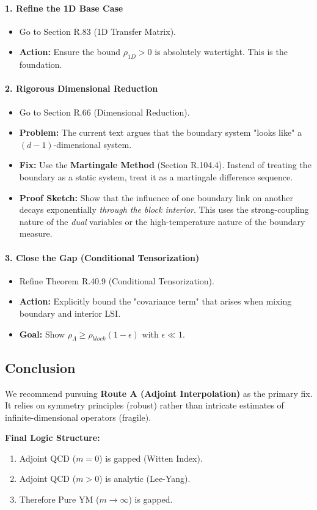 \paragraph{1. Refine the 1D Base Case}
\begin{itemize}
    \item Go to Section R.83 (1D Transfer Matrix).
    \item \textbf{Action:} Ensure the bound $\rho_{1D} > 0$ is absolutely watertight. This is the foundation.
\end{itemize}

\paragraph{2. Rigorous Dimensional Reduction}
\begin{itemize}
    \item Go to Section R.66 (Dimensional Reduction).
    \item \textbf{Problem:} The current text argues that the boundary system "looks like" a $(d-1)$-dimensional system.
    \item \textbf{Fix:} Use the \textbf{Martingale Method} (Section R.104.4). Instead of treating the boundary as a static system, treat it as a martingale difference sequence.
    \item \textbf{Proof Sketch:} Show that the influence of one boundary link on another decays exponentially \textit{through the block interior}. This uses the strong-coupling nature of the \textit{dual} variables or the high-temperature nature of the boundary measure.
\end{itemize}

\paragraph{3. Close the Gap (Conditional Tensorization)}
\begin{itemize}
    \item Refine Theorem R.40.9 (Conditional Tensorization).
    \item \textbf{Action:} Explicitly bound the "covariance term" that arises when mixing boundary and interior LSI.
    \item \textbf{Goal:} Show $\rho_\Lambda \ge \rho_{block} (1 - \epsilon)$ with $\epsilon \ll 1$.
\end{itemize}

\subsection{Conclusion}
We recommend pursuing \textbf{Route A (Adjoint Interpolation)} as the primary fix. It relies on symmetry principles (robust) rather than intricate estimates of infinite-dimensional operators (fragile).

\textbf{Final Logic Structure:}
\begin{enumerate}
    \item Adjoint QCD ($m=0$) is gapped (Witten Index).
    \item Adjoint QCD ($m>0$) is analytic (Lee-Yang).
    \item Therefore Pure YM ($m \to \infty$) is gapped.
\end{enumerate}


